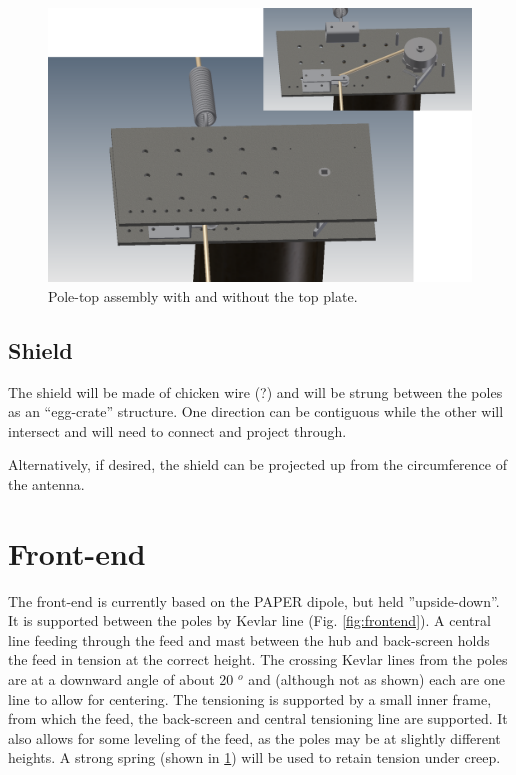 \documentclass[11pt]{article}
\begin{document}
\begin{figure}[H]
\centering
\includegraphics[width=\textwidth]{poletop.png}
\caption{Pole-top assembly with and without the top plate.}
\label{fig:poletop}
\end{figure}

\subsection{Shield}
The shield will be made of chicken wire (?) and will be strung between the poles as an “egg-crate” structure.  One direction can be contiguous while the other will intersect and will need to connect and project through.

Alternatively, if desired, the shield can be projected up from the circumference of the antenna.

\section{Front-end}
The front-end is currently based on the PAPER dipole, but held ''upside-down''.  It is supported between the poles by Kevlar line (Fig. \ref{fig:frontend}).  A central line feeding through the feed and mast between the hub and back-screen holds the feed in tension at the correct height.  The crossing Kevlar lines from the poles are at a downward angle of about 20 $^o$ and (although not as shown) each are one line to allow for centering.  The tensioning is supported by a small inner frame, from which the feed, the back-screen and central tensioning line are supported.  It also allows for some leveling of the feed, as the poles may be at slightly different heights.   A strong spring (shown in \ref{fig:poletop}) will be used to retain tension under creep.
\end{document}
